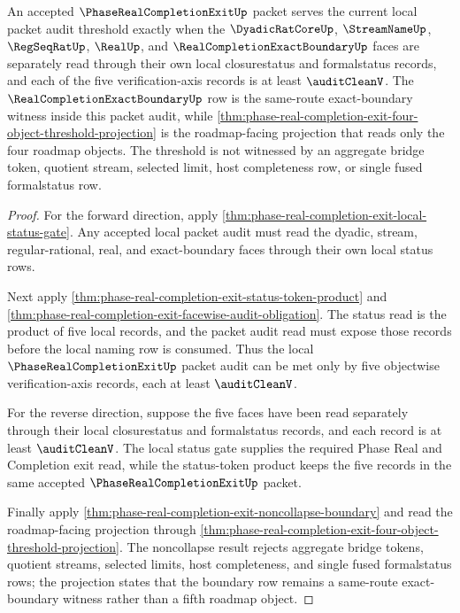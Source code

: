 \begin{theorem}
\label{thm:phase-real-completion-exit-audit-clean-threshold}
An accepted $\PhaseRealCompletionExitUp$ packet serves the current local packet audit threshold exactly when the $\DyadicRatCoreUp$, $\StreamNameUp$, $\RegSeqRatUp$, $\RealUp$, and $\RealCompletionExactBoundaryUp$ faces are separately read through their own local closurestatus and formalstatus records, and each of the five verification-axis records is at least $\auditCleanV$. The $\RealCompletionExactBoundaryUp$ row is the same-route exact-boundary witness inside this packet audit, while \autoref{thm:phase-real-completion-exit-four-object-threshold-projection} is the roadmap-facing projection that reads only the four roadmap objects. The threshold is not witnessed by an aggregate bridge token, quotient stream, selected limit, host completeness row, or single fused formalstatus row.
\end{theorem}
\begin{proof}
For the forward direction, apply \autoref{thm:phase-real-completion-exit-local-status-gate}. Any accepted local packet audit must read the dyadic, stream, regular-rational, real, and exact-boundary faces through their own local status rows.

Next apply \autoref{thm:phase-real-completion-exit-status-token-product} and \autoref{thm:phase-real-completion-exit-facewise-audit-obligation}. The status read is the product of five local records, and the packet audit read must expose those records before the local naming row is consumed. Thus the local $\PhaseRealCompletionExitUp$ packet audit can be met only by five objectwise verification-axis records, each at least $\auditCleanV$.

For the reverse direction, suppose the five faces have been read separately through their local closurestatus and formalstatus records, and each record is at least $\auditCleanV$. The local status gate supplies the required Phase Real and Completion exit read, while the status-token product keeps the five records in the same accepted $\PhaseRealCompletionExitUp$ packet.

Finally apply \autoref{thm:phase-real-completion-exit-noncollapse-boundary} and read the roadmap-facing projection through \autoref{thm:phase-real-completion-exit-four-object-threshold-projection}. The noncollapse result rejects aggregate bridge tokens, quotient streams, selected limits, host completeness, and single fused formalstatus rows; the projection states that the boundary row remains a same-route exact-boundary witness rather than a fifth roadmap object.
\end{proof}

